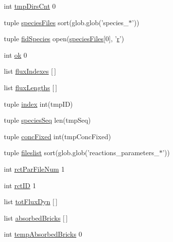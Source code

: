 \begin{DoxyCompactItemize}
\item 
int \hyperlink{namespacebuffered_flux_analysis_ab845ee953d29af3dfb8e8e1c0739b760}{tmp\-Dirs\-Cnt} 0
\item 
tuple \hyperlink{namespacebuffered_flux_analysis_a898dbb3abbe3e409d2ee83d4a5362d6b}{species\-Files} sort(glob.\-glob('species\-\_\-$\ast$'))
\item 
tuple \hyperlink{namespacebuffered_flux_analysis_a56ea4478f0de4eca040d22421819e250}{fid\-Species} open(\hyperlink{namespacebuffered_flux_analysis_a898dbb3abbe3e409d2ee83d4a5362d6b}{species\-Files}\mbox{[}0\mbox{]}, '\hyperlink{_k_s_search_launcher_8m_ac862e7284527eb913b1351c8bfb8e079}{r}')
\item 
int \hyperlink{namespacebuffered_flux_analysis_a2ca9e7b06751f98dec759e29fb4e0ff1}{ok} 0
\item 
list \hyperlink{namespacebuffered_flux_analysis_ae24a834136795f8237a6833f27b1d101}{flux\-Indexes} \mbox{[}$\,$\mbox{]}
\item 
list \hyperlink{namespacebuffered_flux_analysis_ad325fa6a88238fd68ab3877253a8bfbb}{flux\-Lengths} \mbox{[}$\,$\mbox{]}
\item 
tuple \hyperlink{namespacebuffered_flux_analysis_af7658ba15697dfeb9cd4bff8a57c7360}{index} int(tmp\-I\-D)
\item 
tuple \hyperlink{namespacebuffered_flux_analysis_a19a0d4fb7445508e6204894b5f4eca23}{species\-Seq} len(tmp\-Seq)
\item 
tuple \hyperlink{namespacebuffered_flux_analysis_a532dc433988bcc35543c129c92aa9e53}{conc\-Fixed} int(tmp\-Conc\-Fixed)
\item 
tuple \hyperlink{namespacebuffered_flux_analysis_a0d1da0381917a4cdca814e4d430ff367}{fileslist} sort(glob.\-glob('reactions\-\_\-parameters\-\_\-$\ast$'))
\item 
int \hyperlink{namespacebuffered_flux_analysis_aa203d8968b82cc631fffe3da7c46ddfd}{rct\-Par\-File\-Num} 1
\item 
int \hyperlink{namespacebuffered_flux_analysis_ac7b9057f347140dc5ffb27b86665b372}{rct\-I\-D} 1
\item 
list \hyperlink{namespacebuffered_flux_analysis_a8f99b100d2f8191100ee93d633cb7a62}{tot\-Flux\-Dyn} \mbox{[}$\,$\mbox{]}
\item 
list \hyperlink{namespacebuffered_flux_analysis_acd39b5831b0a3150487f722fa3941723}{absorbed\-Bricks} \mbox{[}$\,$\mbox{]}
\item 
int \hyperlink{namespacebuffered_flux_analysis_a83acfbebbbafd68ab6574c76d2be6c60}{temp\-Absorbed\-Bricks} 0

\end{DoxyCompactItemize}

